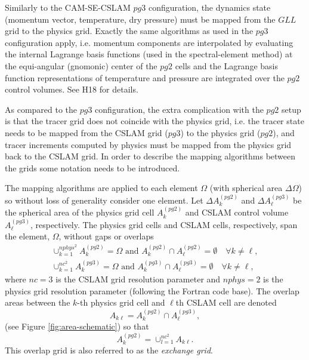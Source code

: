 Similarly to the CAM-SE-CSLAM $pg3$ configuration, the dynamics state (momentum vector, temperature, dry pressure) must be mapped from the $GLL$ grid to the physics grid. Exactly the same algorithms as used in the $pg3$ configuration apply, i.e. momentum components are interpolated by evaluating the internal Lagrange basis functions (used in the spectral-element method) at the equi-angular (gnomonic) center of the $pg2$ cells and the Lagrange basis function representations of temperature and pressure are integrated over the $pg2$ control volumes. See H18 for details.

As compared to the $pg3$ configuration, the extra complication with the $pg2$ setup is that the tracer grid does not coincide with the physics grid, i.e. the tracer state needs to be mapped from the CSLAM grid ($pg3$) to the physics grid ($pg2$), and tracer increments computed by physics must be mapped from the physics grid back to the CSLAM grid. In order to describe the mapping algorithms between the grids some notation needs to be introduced.

The mapping algorithms are applied to each element $\Omega$ (with spherical area $\Delta \Omega$) so without loss of generality consider one element. Let $\Delta A^{(pg2)}_k$ and $\Delta A^{(pg3)}_\ell$ be the spherical area of the physics grid cell $A^{(pg2)}_k$ and CSLAM control volume $A^{(pg3)}_\ell$, respectively. The physics grid cells and CSLAM cells, respectively, span the element, $\Omega$, without gaps or overlaps
\begin{eqnarray}
\cup_{k=1}^{nphys^2}A^{(pg2)}_k=\Omega \text{ and } A^{(pg2)}_k \cap A^{(pg2)}_\ell = \emptyset \quad \forall k\ne \ell,\\
\cup_{k=1}^{nc^2}A^{(pg3)}_k=\Omega \text{ and } A^{(pg3)}_k \cap A^{(pg3)}_\ell = \emptyset \quad \forall k\ne \ell,
\end{eqnarray}
where $nc=3$ is the CSLAM grid resolution parameter and $nphys=2$ is the physics grid  resolution parameter (following the Fortran code base).
The overlap areas between the $k$-th physics grid cell and $\ell$th CSLAM cell are denoted
\begin{equation}
A_{k\ell}=A^{(pg2)}_k \cap A^{(pg3)}_\ell,
\end{equation}
(see Figure \ref{fig:area-schematic}) so that
\begin{equation}
A^{(pg2)}_k=\cup_{l=1}^{nc^2}A_{k\ell}.
\end{equation}
This overlap grid is also referred to as the {\em{exchange grid}}.
